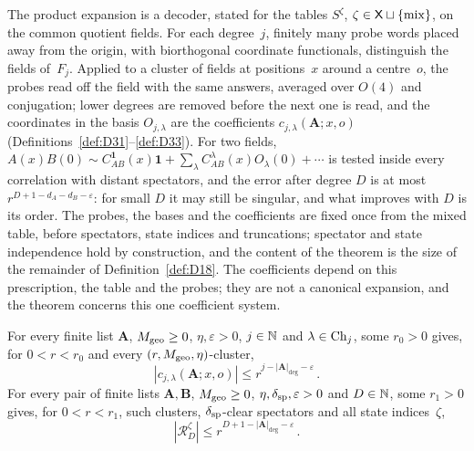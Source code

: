The product expansion is a decoder, stated for the tables $S^\zeta$, $\zeta\in\mathsf{X}\sqcup\{\mathrm{mix}\}$, on the common quotient fields. For each degree~$j$, finitely many probe words placed away from the origin, with biorthogonal coordinate functionals, distinguish the fields of~$F_j$. Applied to a cluster of fields at positions~$x$ around a centre~$o$, the probes read off the field with the same answers, averaged over $O(4)$ and conjugation; lower degrees are removed before the next one is read, and the coordinates in the basis $O_{j,\lambda}$ are the coefficients $c_{j,\lambda}(\boldsymbol A;x,o)$ (Definitions~\ref{def:D31}--\ref{def:D33}). For two fields, $A(x)B(0)\sim C^{\mathbf1}_{AB}(x)\mathbf1+\sum_\lambda C^\lambda_{AB}(x)O_\lambda(0)+\cdots$ is tested inside every correlation with distant spectators, and the error after degree $D$ is at most $r^{D+1-d_A-d_B-\varepsilon}$: for small $D$ it may still be singular, and what improves with $D$ is its order. The probes, the bases and the coefficients are fixed once from the mixed table, before spectators, state indices and truncations; spectator and state independence hold by construction, and the content of the theorem is the size of the remainder of Definition~\ref{def:D18}. The coefficients depend on this prescription, the table and the probes; they are not a canonical expansion, and the theorem concerns this one coefficient system.

\begin{theorem}\label{prop:OP}
For every finite list $\boldsymbol A$, $M_{\rm geo}\ge0$, $\eta,\varepsilon>0$, $j\in\mathbb{N}$ and $\lambda\in\mathrm{Ch}_{j}$, some $r_0>0$ gives, for $0<r<r_0$ and every $(r,M_{\rm geo},\eta)$-cluster,
\begin{equation*}
|c_{j,\lambda}(\boldsymbol A;x,o)|\le r^{j-|\boldsymbol A|_{\deg}-\varepsilon}\,.
\end{equation*}
For every pair of finite lists $\boldsymbol A,\boldsymbol B$, $M_{\rm geo}\ge0$, $\eta,\delta_{\rm sp},\varepsilon>0$ and $D\in\mathbb{N}$, some $r_1>0$ gives, for $0<r<r_1$, such clusters, $\delta_{\rm sp}$-clear spectators and all state indices~$\zeta$,
\begin{equation*}
|\mathcal R_D^\zeta|\le r^{D+1-|\boldsymbol A|_{\deg}-\varepsilon}\,.
\end{equation*}
\end{theorem}

